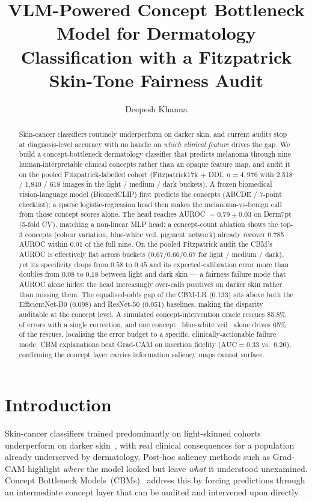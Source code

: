 \documentclass[sigconf,nonacm,screen]{acmart}
\title{VLM-Powered Concept Bottleneck Model for Dermatology Classification
       with a Fitzpatrick Skin-Tone Fairness Audit}
\author{Deepesh Khanna}
\affiliation{%
  \institution{University of Texas at Austin}
}
\begin{document}
\begin{abstract}
Skin-cancer classifiers routinely underperform on darker skin, and current
audits stop at diagnosis-level accuracy with no handle on \emph{which
clinical feature} drives the gap. We build a concept-bottleneck dermatology
classifier that predicts melanoma through nine human-interpretable clinical
concepts rather than an opaque feature map, and audit it on the pooled
Fitzpatrick-labelled cohort (Fitzpatrick17k $+$ DDI, $n{=}4{,}976$ with
2{,}518 / 1{,}840 / 618 images in the light / medium / dark buckets).
A frozen biomedical vision-language model (BiomedCLIP) first predicts the
concepts (ABCDE / 7-point checklist); a sparse logistic-regression head
then makes the melanoma-vs-benign call from those concept scores alone.
The head reaches AUROC $=0.79\pm0.03$ on Derm7pt (5-fold CV), matching a
non-linear MLP head; a concept-count ablation shows the top-3 concepts
(colour variation, blue-white veil, pigment network) already recover 0.785
AUROC within 0.01 of the full nine. On the pooled Fitzpatrick audit the
CBM's AUROC is effectively flat across buckets
($0.67 / 0.66 / 0.67$ for light / medium / dark), yet its specificity
drops from $0.58$ to $0.45$ and its expected-calibration error more than
doubles from $0.08$ to $0.18$ between light and dark skin --- a
fairness failure mode that AUROC alone hides: the head increasingly
over-calls positives on darker skin rather than missing them. The
equalised-odds gap of the CBM-LR (0.133) sits above both the
EfficientNet-B0 (0.098) and ResNet-50 (0.051) baselines, making the
disparity auditable at the concept level. A simulated
concept-intervention oracle rescues 85.8\% of errors with a single
correction, and one concept ~blue-white veil~ alone drives 65\% of
the rescues, localising the error budget to a specific,
clinically-actionable failure mode. CBM explanations beat Grad-CAM on
insertion fidelity ($\mathrm{AUC}=0.33$ vs.\ $0.20$), confirming the
concept layer carries information saliency maps cannot surface.
\end{abstract}


\maketitle

\section{Introduction}
Skin-cancer classifiers trained predominantly on light-skinned cohorts
underperform on darker skin~\cite{daneshjou2022}, with real clinical
consequences for a population already underserved by dermatology. Post-hoc
saliency methods such as Grad-CAM highlight \emph{where} the model looked but
leave \emph{what} it understood unexamined. Concept Bottleneck
Models~(CBMs)~\cite{koh2020cbm} address this by forcing predictions through
an intermediate concept layer that can be audited and intervened upon 
directly.
\end{document}
